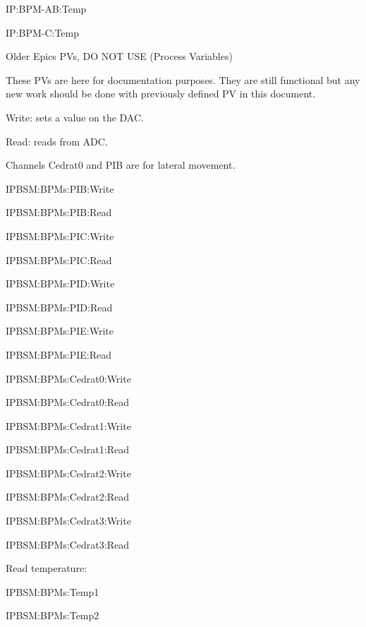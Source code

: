 IP:BPM-AB:Temp\par 
IP:BPM-C:Temp\par 

Older Epics PVs, DO NOT USE (Process Variables)\par 
These PVs are here for documentation purposes. They are still functional but any new work should be done with previously defined PV in this document.\par 
Write: sets a value on the DAC.\par 
Read: reads from ADC.\par 
Channels Cedrat0 and PIB are for lateral movement.\par 

IPBSM:BPMs:PIB:Write\par 
IPBSM:BPMs:PIB:Read\par 
IPBSM:BPMs:PIC:Write\par 
IPBSM:BPMs:PIC:Read\par 
IPBSM:BPMs:PID:Write\par 
IPBSM:BPMs:PID:Read\par 
IPBSM:BPMs:PIE:Write\par 
IPBSM:BPMs:PIE:Read\par 


IPBSM:BPMs:Cedrat0:Write\par 
IPBSM:BPMs:Cedrat0:Read\par 
IPBSM:BPMs:Cedrat1:Write\par 
IPBSM:BPMs:Cedrat1:Read\par 
IPBSM:BPMs:Cedrat2:Write\par 
IPBSM:BPMs:Cedrat2:Read\par 
IPBSM:BPMs:Cedrat3:Write\par 
IPBSM:BPMs:Cedrat3:Read\par 

Read temperature:\par 
IPBSM:BPMs:Temp1\par 
IPBSM:BPMs:Temp2\par 

